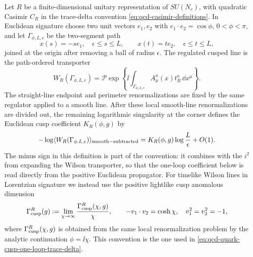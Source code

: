 Let \(R\) be a finite-dimensional unitary representation of \(SU(N_c)\), with
quadratic Casimir \(C_R\) in the trace-delta convention
\eqref{eq:qcd-casimir-definitions}.  In Euclidean signature choose two unit
vectors \(e_1,e_2\) with \(e_1\cdot e_2=\cos\phi\), \(0<\phi<\pi\), and let
\(\Gamma_{\phi,L,\epsilon}\) be the two-segment path
\[
  x(s)=-s e_1,\quad \epsilon\le s\le L,
  \qquad
  x(t)=t e_2,\quad \epsilon\le t\le L,
\]
joined at the origin after removing a ball of radius \(\epsilon\).  The
regulated cusped line is the path-ordered transporter
\[
  W_R(\Gamma_{\phi,L,\epsilon})
  =
  \mathcal P
  \exp\left\{\ii\int_{\Gamma_{\phi,L,\epsilon}}
  A_\mu^a(x)t_R^a\,\dd x^\mu\right\}.
\]
The straight-line endpoint and perimeter renormalizations are fixed by the
same regulator applied to a smooth line.  After these local smooth-line
renormalizations are divided out, the remaining logarithmic singularity at
the corner defines the Euclidean cusp coefficient \(K_R(\phi,g)\) by
\begin{equation}
  -\log\langle W_R(\Gamma_{\phi,L,\epsilon})\rangle_{\rm smooth-subtracted}
  =
  K_R(\phi,g)\log\frac{L}{\epsilon}+O(1).
  \label{eq:qcd-euclidean-cusp-coefficient-definition}
\end{equation}
The minus sign in this definition is part of the convention: it combines with
the \(i^2\) from expanding the Wilson transporter, so that the one-loop
coefficient below is read directly from the positive Euclidean propagator.
For timelike Wilson lines in Lorentzian signature we instead use the
positive lightlike cusp anomalous dimension
\[
  \Gamma_{\rm cusp}^R(g)
  :=
  \lim_{\chi\to\infty}
  \frac{\Gamma_{\rm cusp}^R(\chi,g)}{\chi},
  \qquad
  -v_1\cdot v_2=\cosh\chi,\quad v_1^2=v_2^2=-1,
\]
where \(\Gamma_{\rm cusp}^R(\chi,g)\) is obtained from the same local
renormalization problem by the analytic continuation \(\phi=\ii\chi\).
This convention is the one used in
\eqref{eq:qcd-quark-cusp-one-loop-trace-delta}.

